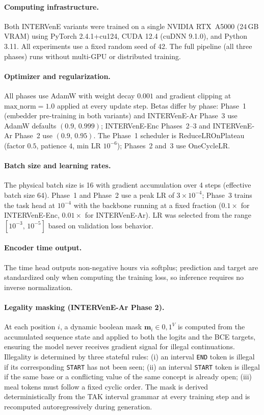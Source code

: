 \paragraph{Computing infrastructure.}
Both INTERVenE variants were trained on a single NVIDIA RTX~A5000 (24\,GB VRAM) using PyTorch 2.4.1+cu124, CUDA 12.4 (cuDNN 9.1.0), and Python 3.11. All experiments use a fixed random seed of 42. The full pipeline (all three phases) runs without multi-GPU or distributed training.

\paragraph{Optimizer and regularization.}
All phases use AdamW with weight decay $0.001$ and gradient clipping at $\mathrm{max\_norm}{=}1.0$ applied at every update step. Betas differ by phase: Phase~1 (embedder pre-training in both variants) and INTERVenE-Ar Phase~3 use AdamW defaults $(0.9,\,0.999)$; INTERVenE-Enc Phases~2--3 and INTERVenE-Ar Phase~2 use $(0.9,\,0.95)$. The Phase~1 scheduler is ReduceLROnPlateau (factor $0.5$, patience $4$, min LR $10^{-6}$); Phases~2 and~3 use OneCycleLR.

\paragraph{Batch size and learning rates.}
The physical batch size is 16 with gradient accumulation over 4 steps (effective batch size 64). Phase~1 and Phase~2 use a peak LR of $3{\times}10^{-4}$; Phase~3 trains the task head at $10^{-4}$ with the backbone running at a fixed fraction ($0.1{\times}$ for INTERVenE-Enc, $0.01{\times}$ for INTERVenE-Ar). LR was selected from the range $[10^{-3},\,10^{-5}]$ based on validation loss behavior.

\paragraph{Encoder time output.}
The time head outputs non-negative hours via softplus; prediction and target are standardized only when computing the training loss, so inference requires no inverse normalization.

\paragraph{Legality masking (INTERVenE-Ar Phase 2).}
\label{app:legality-masking}
At each position $i$, a dynamic boolean mask $\mathbf{m}_i \in {0,1}^{V}$ is computed from the accumulated sequence state and applied to both the logits and the BCE targets, ensuring the model never receives gradient signal for illegal continuations. Illegality is determined by three stateful rules: (i) an interval \texttt{END} token is illegal if its corresponding \texttt{START} has not been seen; (ii) an interval \texttt{START} token is illegal if the same base or a conflicting value of the same concept is already open; (iii) meal tokens must follow a fixed cyclic order. The mask is derived deterministically from the TAK interval grammar at every training step and is recomputed autoregressively during generation.

